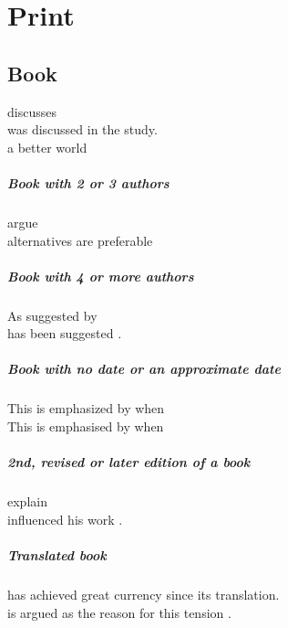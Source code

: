 \documentclass[a4paper,australian,oneside,12pt,footlines=3]{scrbook}%
\theoremstyle{remark}
\begin{document}


\chapter{Print}
\section{Book}
\begin{refsection}
\textcite[108]{Chabon2008} discusses\textelp{}\\
\textelp{} was discussed in the study\parencite[108]{Chabon2008}.\\
\textelp{} a better world\parencite[5]{DGCS2008}

\paragraph{Book with 2 or 3 authors}
\textcite[46]{Campbell2010} argue\textelp{}\\
\textelp{} alternatives are preferable\parencite[46]{Campbell2010}

\paragraph{Book with 4 or more authors}
As  suggested by \textcite[14]{Henkin2006}\textelp{}\\
\textelp{}has been suggested \parencite[14]{Henkin2006}.

\paragraph{Book with no date or an approximate date}
This is emphasized by \textcite{Seah} when\textelp{}\\
This is emphasised by \textcite{Seahcirca2005} when\textelp{}

\paragraph{2nd, revised or later edition of a book}
\textcite{Bordwell2009} explain\textelp{}\\
\textelp{} influenced his work \parencite{Pearce2015}.

\paragraph{Translated book}
\textcite{Kristeva1995} has achieved great currency since its translation.\\
\textelp{}is argued as the reason for this tension \parencite{Kristeva1995}.


\end{refsection}
\end{document}
